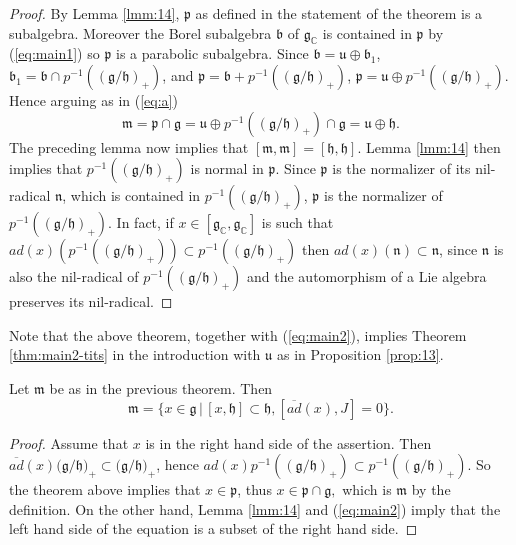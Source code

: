 \documentclass{amse-new}
\numberwithin{equation}{section} %
\begin{document}
\begin{proof} By Lemma \ref{lmm:14}, $\mathfrak{p}$ as defined in the statement of the theorem  is a subalgebra. Moreover the Borel subalgebra  $\mathfrak{b}$ of $\mathfrak{g}_{\mathbb{C}}$ is contained in $\mathfrak{p}$ by (\ref{eq:main1}) so $\mathfrak{p}$ is a parabolic
subalgebra. Since $\mathfrak{b}=\mathfrak{u}\oplus \mathfrak{b}_1$, $\mathfrak{b}_1=\mathfrak{b}\cap
p^{-1}((\mathfrak{g}/\mathfrak{h})_{+})$, and $\mathfrak{p}=\mathfrak{b}+p^{-1} ((\mathfrak{g}/\mathfrak{h})_+)$, $\mathfrak{p}=\mathfrak{u}\oplus p^{-1} ((\mathfrak{g}/\mathfrak{h})_+)$. Hence arguing as in (\ref{eq:a})
\begin{equation}\label{eq:main2}
\mathfrak{m}=\mathfrak{p}\cap\mathfrak{g}=\mathfrak{u}\oplus
p^{-1} ((\mathfrak{g}/\mathfrak{h})_+)\cap
\mathfrak{g}=\mathfrak{u}\oplus\mathfrak{h}.
\end{equation}
The preceding lemma now implies that $[\mathfrak{m},\mathfrak{m}%
]=[\mathfrak{h},\mathfrak{h}]$. Lemma \ref{lmm:14} then implies that
$p^{-1} ((\mathfrak{g}/\mathfrak{h})_+)$ is normal in $\mathfrak{p}$.  Since
$\mathfrak{p}$ is the normalizer
of its nil-radical $\mathfrak{n}$, which is contained in $p^{-1} ((\mathfrak{g}/\mathfrak{h})_+)$, $\mathfrak{p}$ is the normalizer of $p^{-1}((\mathfrak{g}/\mathfrak{h})_+)$. In fact, if $x\in [\mathfrak{g}_\mathbb{C}, \mathfrak{g}_\mathbb{C}]$ is such that $ad(x) (p^{-1} ((\mathfrak{g}/\mathfrak{h})_+))\subset p^{-1} ((\mathfrak{g}/\mathfrak{h})_+)$ then  $ad(x) (\mathfrak{n})\subset \mathfrak{n}$, since $\mathfrak{n}$ is also the nil-radical of $p^{-1} ((\mathfrak{g}/\mathfrak{h})_+)$ and the automorphism of a Lie algebra preserves its nil-radical.\end{proof}
Note that the above theorem, together with (\ref{eq:main2}), implies Theorem \ref{thm:main2-tits} in the introduction with $\mathfrak{u}$ as in Proposition \ref{prop:13}.
\begin{corollary}
\label{coro:12} Let $\mathfrak{m}$ be as in the previous theorem. Then
\[
\mathfrak{m}=\{x\in\mathfrak{g}\, |\, [x,\mathfrak{h}]\subset\mathfrak{h}%
,[\overline{ad}(x),J]=0\}.
\]
\end{corollary}

\begin{proof}
Assume that $x$ is in the right hand side of the assertion. Then
$\overline{ad}(x)(\mathfrak{g}/\mathfrak{h)}_{+}\subset(\mathfrak{g}%
/\mathfrak{h)}_{+}$, hence $ad(x)p^{-1} ((\mathfrak{g}/\mathfrak{h})_+)\subset
p^{-1} ((\mathfrak{g}/\mathfrak{h})_+)$. So the theorem above implies that
$x\in \mathfrak{p}$, thus $x\in\mathfrak{p}\cap\mathfrak{g},$  which is $\mathfrak{m}$ by the definition. On the other hand, Lemma \ref{lmm:14} and (\ref{eq:main2}) imply that the left hand side of the equation is a subset of the right hand side.
\end{proof}
\end{document}
